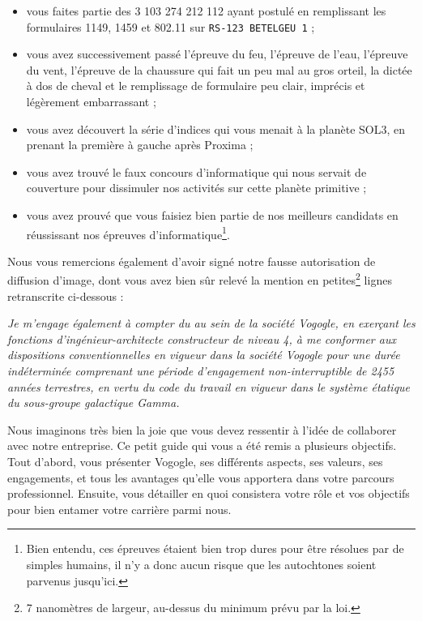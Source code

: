 \begin{itemize}
    \item vous faites partie des 3 103 274 212 112 ayant postulé en remplissant
        les formulaires 1149, 1459 et 802.11 sur \texttt{RS-123 BETELGEU~1} ;
    \item vous avez successivement passé l'épreuve du feu, l'épreuve de l'eau,
        l'épreuve du vent, l'épreuve de la chaussure qui fait un peu mal au
        gros orteil, la dictée à dos de cheval et le remplissage de formulaire
        peu clair, imprécis et légèrement embarrassant ;
    \item vous avez découvert la série d'indices qui vous menait à la planète
        SOL3, en prenant la première à gauche après Proxima ;
    \item vous avez trouvé le faux concours d'informatique qui nous servait de
        couverture pour dissimuler nos activités sur cette planète primitive ;
    \item vous avez prouvé que vous faisiez bien partie de nos meilleurs
        candidats en réussissant nos épreuves d'informatique\footnote{Bien
        entendu, ces épreuves étaient bien trop dures pour être résolues par de
        simples humains, il n'y a donc aucun risque que les autochtones soient
        parvenus jusqu'ici.}.
\end{itemize}

Nous vous remercions également d'avoir signé notre fausse autorisation de
diffusion d'image, dont vous avez bien sûr relevé la mention en
petites\footnote{7 nanomètres de largeur, au-dessus du minimum prévu par la
loi.} lignes retranscrite ci-dessous :

\emph{Je m'engage également à compter du au sein de la société Vogogle, en
exerçant les fonctions d'ingénieur-architecte constructeur de niveau 4, à me
conformer aux dispositions conventionnelles en vigueur dans la société Vogogle
pour une durée indéterminée comprenant une période d'engagement
non-interruptible de 2455 années terrestres, en vertu du code du travail en
vigueur dans le système étatique du sous-groupe galactique Gamma.}

Nous imaginons très bien la joie que vous devez ressentir à l'idée de
collaborer avec notre entreprise. Ce petit guide qui vous a été remis a
plusieurs objectifs. Tout d'abord, vous présenter Vogogle, ses différents
aspects, ses valeurs, ses engagements, et tous les avantages qu'elle vous
apportera dans votre parcours professionnel. Ensuite, vous détailler en quoi
consistera votre rôle et vos objectifs pour bien entamer votre carrière parmi
nous.

